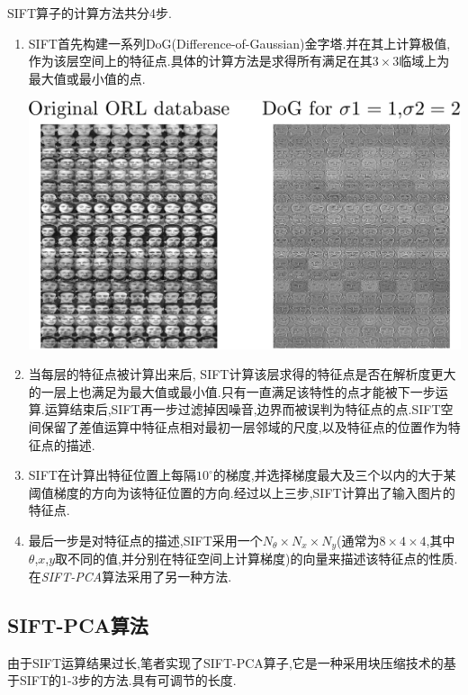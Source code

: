 SIFT算子的计算方法共分4步.
\begin{enumerate}
	\item SIFT首先构建一系列DoG(Difference-of-Gaussian)金字塔.并在其上计算极值,作为该层空间上的特征点.具体的计算方法是求得所有满足在其$3 \times 3$临域上为最大值或最小值的点. 

	 	\begin{center}
		\begin{minipage}[t]{\linewidth}
		\center
		{
		\includegraphics[width=\textwidth]{Img/c3/dog_demo} 
		}
		\end{minipage}
		\medskip
		\end{center}
	
	\item 当每层的特征点被计算出来后, SIFT计算该层求得的特征点是否在解析度更大的一层上也满足为最大值或最小值.只有一直满足该特性的点才能被下一步运算.运算结束后,SIFT再一步过滤掉因噪音,边界而被误判为特征点的点.SIFT空间保留了差值运算中特征点相对最初一层邻域的尺度,以及特征点的位置作为特征点的描述.
	\item SIFT在计算出特征位置上每隔$10^\circ$的梯度,并选择梯度最大及三个以内的大于某阈值梯度的方向为该特征位置的方向.经过以上三步,SIFT计算出了输入图片的特征点.
	\item 最后一步是对特征点的描述,SIFT采用一个$N_\theta \times N_x \times N_y$(通常为$8 \times 4 \times 4$,其中$\theta$,$x$,$y$取不同的值,并分别在特征空间上计算梯度)的向量来描述该特征点的性质.在\textit{SIFT-PCA}算法采用了另一种方法.
\end{enumerate}

\subsection{SIFT-PCA算法}
由于SIFT运算结果过长,笔者实现了SIFT-PCA算子\cite{ke2004pca},它是一种采用块压缩技术的基于SIFT的1-3步的方法.具有可调节的长度.


